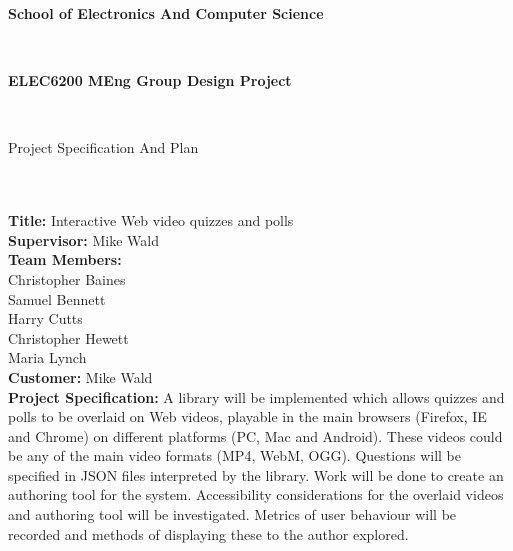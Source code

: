 \documentclass[12pt,a4paper]{article}
\begin{document}

\begin{Large}
\textbf{School of Electronics And Computer Science
}\end{Large}\\

\begin{Large}
\textbf{ELEC6200    MEng Group Design Project
}\end{Large}\\

\begin{Large}
Project Specification And Plan
\end{Large}\\\\

\textbf{Title:}
Interactive Web video quizzes and polls\\

\textbf{Supervisor:}	
Mike Wald\\

\textbf{Team Members:}\\
Christopher Baines\\
Samuel Bennett\\
Harry Cutts\\
Christopher Hewett\\
Maria Lynch\\

\textbf{Customer:}
Mike Wald\\

\textbf{Project Specification:}
A library will be implemented which allows quizzes and polls to be overlaid on Web videos, playable in the main browsers (Firefox, IE and Chrome) on different platforms (PC, Mac and Android). These videos could be any of the main video formats (MP4, WebM, OGG). Questions will be specified in JSON files interpreted by the library. Work will be done to create an authoring tool for the system. Accessibility considerations for the overlaid videos and authoring tool will be investigated. Metrics of user behaviour will be recorded and methods of displaying these to the author explored.
\\
\end{document}
